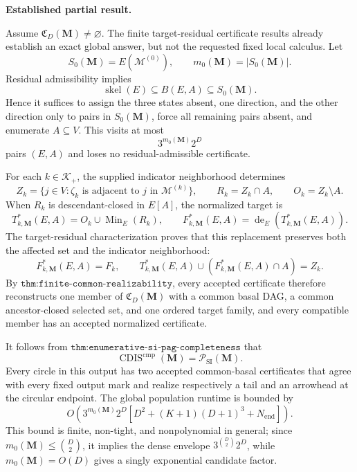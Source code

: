 \textbf{Established partial result.}

Assume \(\mathfrak C_D(\mathbf M)\ne\varnothing\).  The finite target-residual certificate results already establish an exact global answer, but not the requested fixed local calculus.  Let
\[
S_0(\mathbf M)=E(\mathcal M^{(0)}),
\qquad
m_0(\mathbf M)=|S_0(\mathbf M)|.
\]
Residual admissibility implies
\[
\operatorname{skel}(E)\subseteq B(E,A)\subseteq S_0(\mathbf M).
\]
Hence it suffices to assign the three states absent, one direction, and the other direction only to pairs in \(S_0(\mathbf M)\), force all remaining pairs absent, and enumerate \(A\subseteq V\).  This visits at most
\[
3^{m_0(\mathbf M)}2^D
\]
pairs \((E,A)\) and loses no residual-admissible certificate.

For each \(k\in\mathcal K_+\), the supplied indicator neighborhood determines
\[
Z_k=\{j\in V:\zeta_k\text{ is adjacent to }j\text{ in }\mathcal M^{(k)}\},
\qquad
R_k=Z_k\cap A,
\qquad
O_k=Z_k\setminus A.
\]
When \(R_k\) is descendant-closed in \(E[A]\), the normalized target is
\[
T^*_{k,\mathbf M}(E,A)=O_k\cup\operatorname{Min}_E(R_k),
\qquad
F^*_{k,\mathbf M}(E,A)=\operatorname{de}_E\!\left(T^*_{k,\mathbf M}(E,A)\right).
\]
The target-residual characterization proves that this replacement preserves both the affected set and the indicator neighborhood:
\[
F^*_{k,\mathbf M}(E,A)=F_k,
\qquad
T^*_{k,\mathbf M}(E,A)\cup(F^*_{k,\mathbf M}(E,A)\cap A)=Z_k.
\]
By \(\texttt{thm:finite-common-realizability}\), every accepted certificate therefore reconstructs one member of \(\mathfrak C_D(\mathbf M)\) with a common basal DAG, a common ancestor-closed selected set, and one ordered target family, and every compatible member has an accepted normalized certificate.

It follows from \(\texttt{thm:enumerative-si-pag-completeness}\) that
\[
\operatorname{CDIS}^{\mathrm{cmp}}(\mathbf M)
=\mathcal P_{\mathrm{SI}}(\mathbf M).
\]
Every circle in this output has two accepted common-basal certificates that agree with every fixed output mark and realize respectively a tail and an arrowhead at the circular endpoint.  The global population runtime is bounded by
\[
O\!\left(
3^{m_0(\mathbf M)}2^D
\left[D^2+(K+1)(D+1)^3+N_{\mathrm{end}}\right]
\right).
\]
This bound is finite, non-tight, and nonpolynomial in general; since \(m_0(\mathbf M)\le\binom D2\), it implies the dense envelope \(3^{\binom D2}2^D\), while \(m_0(\mathbf M)=O(D)\) gives a singly exponential candidate factor.

